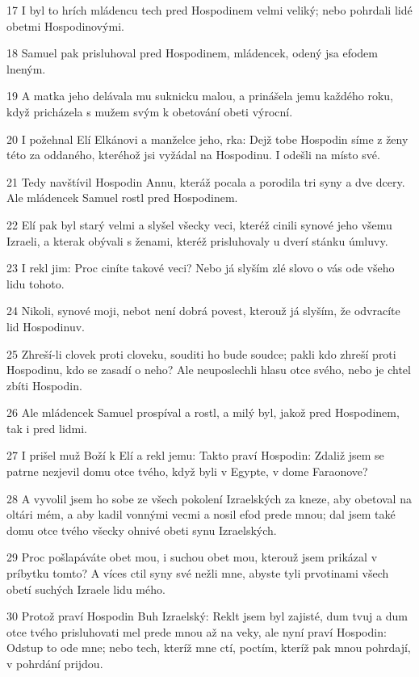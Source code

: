 \par 17 I byl to hrích mládencu tech pred Hospodinem velmi veliký; nebo pohrdali lidé obetmi Hospodinovými.
\par 18 Samuel pak prisluhoval pred Hospodinem, mládencek, odený jsa efodem lneným.
\par 19 A matka jeho delávala mu suknicku malou, a prinášela jemu každého roku, když pricházela s mužem svým k obetování obeti výrocní.
\par 20 I požehnal Elí Elkánovi a manželce jeho, rka: Dejž tobe Hospodin síme z ženy této za oddaného, kteréhož jsi vyžádal na Hospodinu. I odešli na místo své.
\par 21 Tedy navštívil Hospodin Annu, kteráž pocala a porodila tri syny a dve dcery. Ale mládencek Samuel rostl pred Hospodinem.
\par 22 Elí pak byl starý velmi a slyšel všecky veci, kteréž cinili synové jeho všemu Izraeli, a kterak obývali s ženami, kteréž prisluhovaly u dverí stánku úmluvy.
\par 23 I rekl jim: Proc ciníte takové veci? Nebo já slyším zlé slovo o vás ode všeho lidu tohoto.
\par 24 Nikoli, synové moji, nebot není dobrá povest, kterouž já slyším, že odvracíte lid Hospodinuv.
\par 25 Zhreší-li clovek proti cloveku, souditi ho bude soudce; pakli kdo zhreší proti Hospodinu, kdo se zasadí o neho? Ale neuposlechli hlasu otce svého, nebo je chtel zbíti Hospodin.
\par 26 Ale mládencek Samuel prospíval a rostl, a milý byl, jakož pred Hospodinem, tak i pred lidmi.
\par 27 I prišel muž Boží k Elí a rekl jemu: Takto praví Hospodin: Zdaliž jsem se patrne nezjevil domu otce tvého, když byli v Egypte, v dome Faraonove?
\par 28 A vyvolil jsem ho sobe ze všech pokolení Izraelských za kneze, aby obetoval na oltári mém, a aby kadil vonnými vecmi a nosil efod prede mnou; dal jsem také domu otce tvého všecky ohnivé obeti synu Izraelských.
\par 29 Proc pošlapáváte obet mou, i suchou obet mou, kterouž jsem prikázal v príbytku tomto? A víces ctil syny své nežli mne, abyste tyli prvotinami všech obetí suchých Izraele lidu mého.
\par 30 Protož praví Hospodin Buh Izraelský: Reklt jsem byl zajisté, dum tvuj a dum otce tvého prisluhovati mel prede mnou až na veky, ale nyní praví Hospodin: Odstup to ode mne; nebo tech, kteríž mne ctí, poctím, kteríž pak mnou pohrdají, v pohrdání prijdou.
